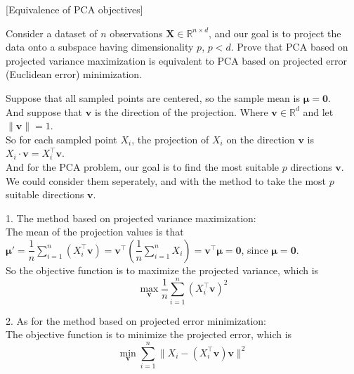\item {} [Equivalence of PCA objectives]

Consider a dataset of $n$ observations $\mathbf{X}\in \mathbb{R}^{n \times d}$, and our goal is to project the data onto a subspace having dimensionality $p$, $p<d$. Prove that PCA based on projected variance maximization is equivalent to PCA based on projected error (Euclidean error) minimization.

\solution

Suppose that all sampled points are centered, so the sample mean is $\mathbf{\mu}=\mathbf{0}$. \\
And suppose that $\mathbf{v}$ is the direction of the projection. Where $\mathbf{v}\in \mathbb{R}^d$ and let $\|\mathbf{v}\|=1$. \\
So for each sampled point $X_i$, the projection of $X_i$ on the direction $\mathbf{v}$ is $X_i\cdot \mathbf{v}=X_i^{\top}\mathbf{v}$. \\
And for the PCA problem, our goal is to find the most suitable $p$ directions $\mathbf{v}$. We could consider them seperately, and with the method to take the most $p$ suitable directions $\mathbf{v}$.

1. The method based on projected variance maximization: \\
The mean of the projection values is that $\mathbf{\mu'}=\dfrac{1}{n}\sum\limits_{i=1}^n\left(X_i^{\top}\mathbf{v}\right)=\mathbf{v}^{\top}(\dfrac{1}{n}\sum\limits_{i=1}^nX_i)=\mathbf{v}^{\top}\mathbf{\mu}=\mathbf{0}$, since $\mathbf{\mu}=\mathbf{0}$. \\
So the objective function is to maximize the projected variance, which is
$$\max_{\mathbf{v}} \dfrac{1}{n}\sum\limits_{i=1}^n \left(X_i^{\top}\mathbf{v}\right)^2$$

2. As for the method based on projected error minimization: \\
The objective function is to minimize the projected error, which is
$$\min_{\mathbf{v}} \sum\limits_{i=1}^n \|X_i-\left(X_i^{\top}\mathbf{v}\right)\mathbf{v}\|^2$$

